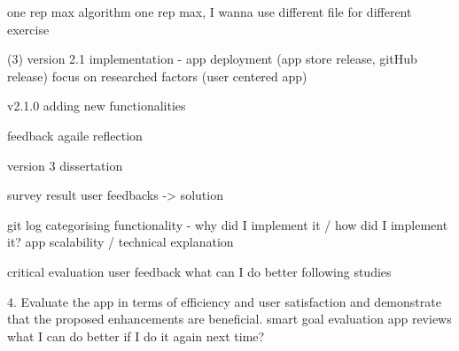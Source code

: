 one rep max algorithm
one rep max, I wanna use different file for different exercise


(3) version 2.1 implementation - app deployment (app store release, gitHub release)
focus on researched factors (user centered app)


\version v2.1.0 {
    adding new functionalities
} 














feedback agaile reflection


version 3 dissertation

survey result
user feedbacks -> solution


git log categorising
functionality - why did I implement it / how did I implement it?
app scalability / technical explanation



critical evaluation
user feedback
what can I do better
following studies

4. Evaluate the app in terms of efficiency and user satisfaction and demonstrate that the proposed enhancements are beneficial.
	smart goal evaluation
	app reviews
	what I can do better if I do it again next time?